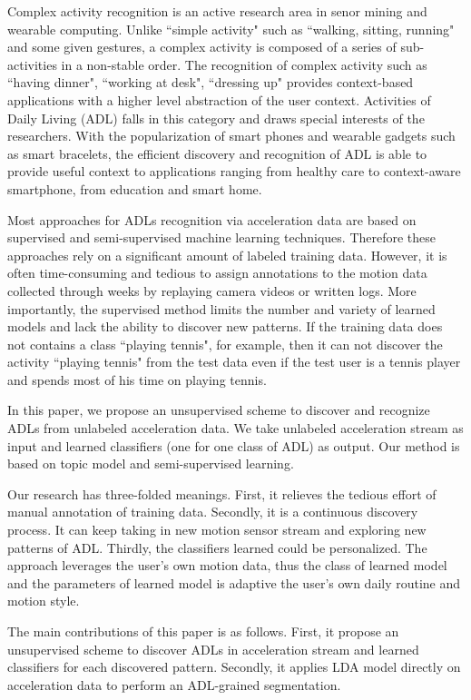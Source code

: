 \documentclass{sigchi}
\begin{document}
Complex activity recognition is an active research area in senor mining and wearable computing.
Unlike ``simple activity" such as ``walking, sitting, running" and some given gestures, a complex activity \cite{rai2012mining} is composed of a series of sub-activities in a non-stable order.
The recognition of complex activity such as ``having dinner", ``working at desk", ``dressing up" provides context-based applications with a higher level abstraction of the user context.
Activities of Daily Living (ADL) falls in this category and draws special interests of the researchers.
With the popularization of smart phones and wearable gadgets such as smart bracelets, the efficient discovery and recognition of ADL is able to provide useful context to applications ranging from healthy care to context-aware smartphone, from education and smart home.

Most approaches for ADLs recognition via acceleration data are based on supervised and semi-supervised machine learning techniques.
Therefore these approaches rely on a significant amount of labeled training data.
However, it is often time-consuming and tedious to assign annotations to the motion data collected through weeks by replaying camera videos or written logs.
More importantly, the supervised method limits the number and variety of learned models and lack the ability to discover new patterns.
If the training data does not contains a class ``playing tennis", for example, then it can not discover the activity ``playing tennis" from the test data even if the test user is a tennis player and spends most of his time on playing tennis.

In this paper, we propose an unsupervised scheme to discover and recognize ADLs from unlabeled acceleration data.
We take unlabeled acceleration stream as input and learned classifiers (one for one class of ADL) as output. Our method is based on topic model and semi-supervised learning.

Our research has three-folded meanings.
First, it relieves the tedious effort of manual annotation of training data.
Secondly, it is a continuous discovery process.
It can keep taking in new motion sensor stream and exploring new patterns of ADL.
Thirdly, the classifiers learned could be personalized.
The approach leverages the user's own motion data, thus the class of learned model and the parameters of learned model is adaptive the user's own daily routine and motion style.

The main contributions of this paper is as follows.
First, it propose an unsupervised scheme to discover ADLs in acceleration stream and learned classifiers for each discovered pattern.
Secondly, it applies LDA model directly on acceleration data to perform an ADL-grained segmentation.
\end{document}
